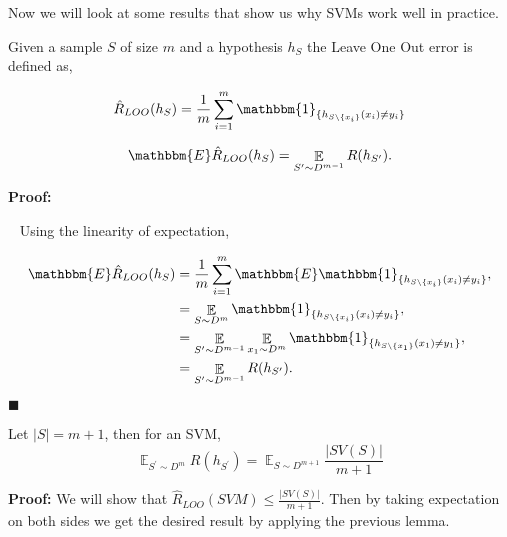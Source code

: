 \documentclass[a4paper,english,12pt]{article}
\begin{document}
Now we will look at some results that show us why SVMs work well in practice.

\begin{defn}
Given a sample $S$ of size $m$ and a hypothesis $h_S$ the Leave One Out error is defined as,

\begin{equation}
\hat{R}_{LOO}(h_S) = \frac1m \sum_{i = 1}^m \mathbbm{1}_{\{h_{S \backslash \{x_i\}}(x_i) \neq y_i\}}
\end{equation}

\end{defn}

\begin{lem}

\begin{equation}
\mathbbm{E} \hat{R}_{LOO}(h_S) =  \mathop{\mathbb{E}}_{S ^\prime \sim D^{m-1}} R(h_{S^\prime}) .  
\end{equation}

\end{lem}

{\bf Proof:}

~
Using the linearity of expectation,

\begin{align}
\mathbbm{E} \hat{R}_{LOO}(h_S) &= \frac1m \sum_{i = 1}^m  \mathbbm{E} \mathbbm{1}_{\{h_{S \backslash \{x_i\}}(x_i) \neq y_i\}},\\
&=  \mathop{\mathbb{E}}_{S  \sim D^{m}} \mathbbm{1}_{\{h_{S \backslash \{x_i\}}(x_i) \neq y_i\}}, \\
&=  \mathop{\mathbb{E}}_{S ^\prime \sim D^{m-1}} \mathop{\mathbb{E}}_{x_1 \sim D^{m}} \mathbbm{1}_{\{h_{S \backslash \{x_1\}}(x_1) \neq y_1\}},\\
&= \mathop{\mathbb{E}}_{S ^\prime \sim D^{m-1}} R(h_{S^\prime}).
\end{align}

\begin{flushright}
$\blacksquare$
\end{flushright}


\begin{thm}
Let $|S| =  m+1$, then for an SVM,
\begin{equation}
 \mathop{\mathbb{E}}_{S ^\prime \sim D^{m}} R(h_{S^\prime}) = \mathop{\mathbb{E}}_{S \sim D^{m + 1}} \frac{|SV(S)|}{m+1}
\end{equation}
\end{thm}

{\bf Proof:}
We will show that $\hat{R}_{LOO}(SVM) \leq \frac{|SV(S)|}{m+1} $. Then by taking expectation on both sides we get the desired result by applying the previous lemma.
\end{document}
